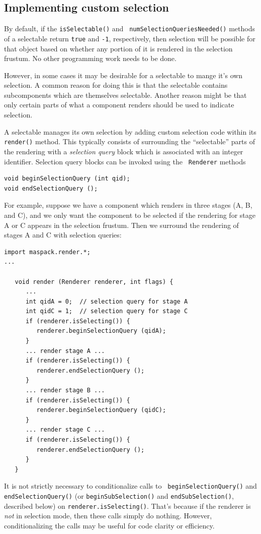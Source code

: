 \subsection{Implementing custom selection}
\label{managingOwnSelectionSec}

By default, if the {\tt isSelectable()} and {\tt
numSelectionQueriesNeeded()} methods of a selectable return {\tt true}
and {\tt -1}, respectively, then selection will be possible for that
object based on whether any portion of it is rendered in the selection
frustum. No other programming work needs to be done.

However, in some cases it may be desirable for a selectable to mange
it's own selection. A common reason for doing this is that the
selectable contains subcomponents which are themselves
selectable. Another reason might be that only certain parts of what a
component renders should be used to indicate selection.

A selectable manages its own selection by adding custom selection code
within its {\tt render()} method. This typically consists of
surrounding the ``selectable'' parts of the rendering with a {\it
selection query} block which is associated with an integer
identifier.  Selection query blocks can be invoked using the {\tt
Renderer} methods
%
\begin{lstlisting}[]
void beginSelectionQuery (int qid);
void endSelectionQuery ();
\end{lstlisting}
%
For
example, suppose we have a component which renders in three stages (A,
B, and C), and we only want the component to be selected if the
rendering for stage A or C appears in the selection frustum. Then we
surround the rendering of stages A and C with selection queries:
\begin{lstlisting}[]
import maspack.render.*;
...

   void render (Renderer renderer, int flags) {
      ...
      int qidA = 0;  // selection query for stage A
      int qidC = 1;  // selection query for stage C
      if (renderer.isSelecting()) {
         renderer.beginSelectionQuery (qidA);
      }
      ... render stage A ...
      if (renderer.isSelecting()) {
         renderer.endSelectionQuery ();
      }
      ... render stage B ...
      if (renderer.isSelecting()) {
         renderer.beginSelectionQuery (qidC);
      }
      ... render stage C ...
      if (renderer.isSelecting()) {
         renderer.endSelectionQuery ();
      }
   }
\end{lstlisting}
%
\begin{sideblock}
It is not strictly necessary to conditionalize calls to {\tt
beginSelectionQuery()} and {\tt endSelectionQuery()} (or
{\tt beginSubSelection()} and {\tt endSubSelection()}, described below) on
{\tt renderer.isSelecting()}. That's because if the renderer is {\it
not} in selection mode, then these calls simply do nothing. However,
conditionalizing the calls may be useful for code clarity or efficiency.
\end{sideblock}

